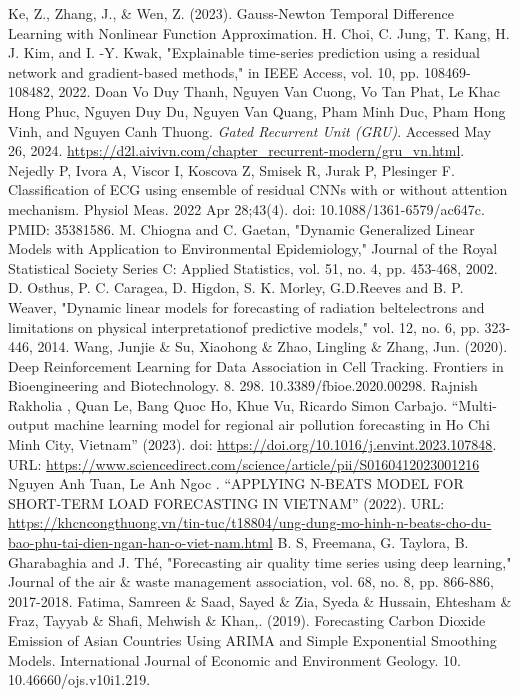 \documentclass[conference]{IEEEtran}
\begin{document}
\begin{thebibliography}{00}
     Ke, Z., Zhang, J., \& Wen, Z. (2023). Gauss-Newton Temporal Difference Learning with Nonlinear Function Approximation.
     H. Choi, C. Jung, T. Kang, H. J. Kim, and I. -Y. Kwak, "Explainable time-series prediction using a residual network and gradient-based methods," in IEEE Access, vol. 10, pp. 108469-108482, 2022.
     Doan Vo Duy Thanh, Nguyen Van Cuong, Vo Tan Phat, Le Khac Hong Phuc, Nguyen Duy Du, Nguyen Van Quang, Pham Minh Duc, Pham Hong Vinh, and Nguyen Canh Thuong. \textit{Gated Recurrent Unit (GRU)}. Accessed May 26, 2024. \url{https://d2l.aivivn.com/chapter_recurrent-modern/gru_vn.html}.
     Nejedly P, Ivora A, Viscor I, Koscova Z, Smisek R, Jurak P, Plesinger F. Classification of ECG using ensemble of residual CNNs with or without attention mechanism. Physiol Meas. 2022 Apr 28;43(4). doi: 10.1088/1361-6579/ac647c. PMID: 35381586.
     M. Chiogna and C. Gaetan, "Dynamic Generalized Linear Models with Application to Environmental Epidemiology," Journal of the Royal Statistical Society Series C: Applied Statistics, vol. 51, no. 4, pp. 453-468, 2002.
     D. Osthus, P. C. Caragea, D. Higdon, S. K. Morley, G.D.Reeves and B. P. Weaver, "Dynamic linear models for forecasting of radiation beltelectrons and limitations on physical interpretationof predictive models," vol. 12, no. 6, pp. 323-446, 2014.
     Wang, Junjie \& Su, Xiaohong \& Zhao, Lingling \& Zhang, Jun. (2020). Deep Reinforcement Learning for Data Association in Cell Tracking. Frontiers in Bioengineering and Biotechnology. 8. 298. 10.3389/fbioe.2020.00298.
     Rajnish Rakholia , Quan Le, Bang Quoc Ho, Khue Vu, Ricardo Simon Carbajo. “Multi-output machine learning model for regional air pollution forecasting in Ho Chi Minh City, Vietnam” (2023). doi: \url{https://doi.org/10.1016/j.envint.2023.107848}. URL: \url{https://www.sciencedirect.com/science/article/pii/S0160412023001216}
     Nguyen Anh Tuan, Le Anh Ngoc . “APPLYING N-BEATS MODEL FOR SHORT-TERM LOAD FORECASTING IN VIETNAM” (2022). URL: \url{https://khcncongthuong.vn/tin-tuc/t18804/ung-dung-mo-hinh-n-beats-cho-du-bao-phu-tai-dien-ngan-han-o-viet-nam.html}
     B. S, Freemana, G. Taylora, B. Gharabaghia and J. Thé, "Forecasting air quality time series using deep learning," Journal of the air \& waste management association, vol. 68, no. 8, pp. 866-886, 2017-2018.
     Fatima, Samreen \& Saad, Sayed \& Zia, Syeda \& Hussain, Ehtesham \& Fraz, Tayyab \& Shafi, Mehwish \& Khan,. (2019). Forecasting Carbon Dioxide Emission of Asian Countries Using ARIMA and Simple Exponential Smoothing Models. International Journal of Economic and Environment Geology. 10. 10.46660/ojs.v10i1.219.

\end{thebibliography}
\end{document}
